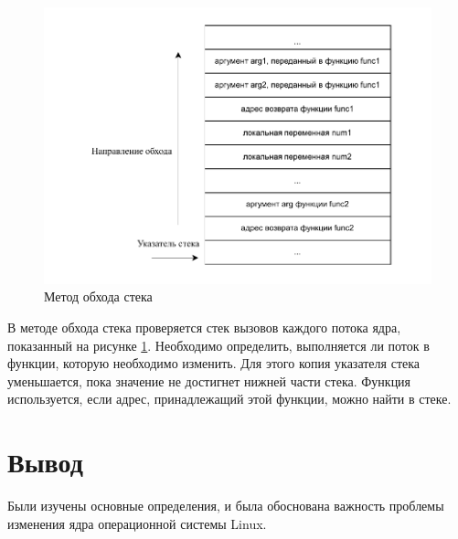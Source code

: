 \begin{figure}[H]
	\begin{center}
		\includegraphics[scale=0.9]{img/call-stack.pdf}
	\end{center}
	\captionsetup{justification=centering}
	\caption{Метод обхода стека}
	\label{img:call-stack}
\end{figure}

В методе обхода стека проверяется стек вызовов каждого потока ядра, показанный на рисунке \ref{img:call-stack}. Необходимо определить, выполняется ли поток в функции, которую необходимо изменить. Для этого копия указателя стека уменьшается, пока значение не достигнет нижней части стека. Функция используется, если адрес, принадлежащий этой функции, можно найти в стеке.


\section{Вывод}

Были изучены основные определения, и была обоснована важность проблемы изменения ядра операционной системы Linux.